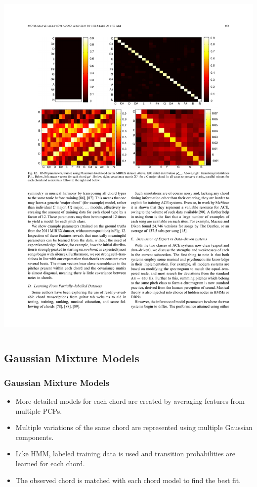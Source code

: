\documentclass{beamer}
\begin{document}
\begin{frame}
\begin{columns}
\begin{column}{.4\textwidth}
	\includegraphics[width=.95\textwidth]{transitionProbabilities2.pdf}
	\end{column}
	\end{columns}
\end{frame}

\subsection{Gaussian Mixture Models}

\begin{frame}
	\frametitle{Gaussian Mixture Models}
	\begin{itemize}
		\item More detailed models for each chord are created by averaging features from multiple PCPs.
		\item Multiple variations of the same chord are represented using multiple Gaussian components.
		\item Like HMM, labeled training data is used and transition probabilities are learned for each chord.
		\item The observed chord is matched with each chord model to find the best fit.
		
	\end{itemize}
\end{frame}
\end{document}
